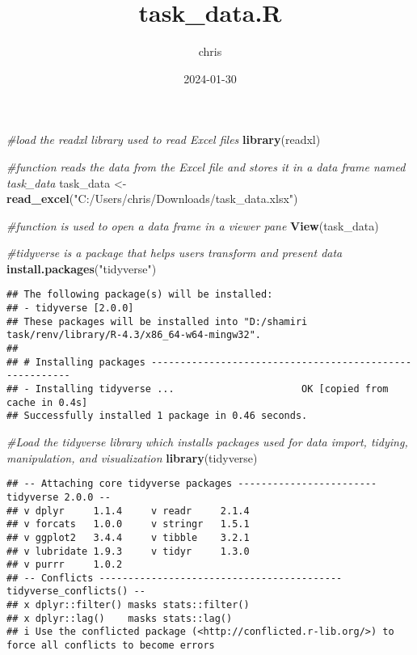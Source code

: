 \documentclass[
]{article}
\title{task\_data.R}
\author{chris}
\date{2024-01-30}
\newenvironment{Shaded}{\begin{snugshade}}{\end{snugshade}}
\newcommand{\CommentTok}[1]{\textcolor[rgb]{0.56,0.35,0.01}{\textit{#1}}}
\newcommand{\FunctionTok}[1]{\textcolor[rgb]{0.13,0.29,0.53}{\textbf{#1}}}
\newcommand{\NormalTok}[1]{#1}
\newcommand{\OtherTok}[1]{\textcolor[rgb]{0.56,0.35,0.01}{#1}}
\newcommand{\StringTok}[1]{\textcolor[rgb]{0.31,0.60,0.02}{#1}}
\begin{document}
\maketitle

\begin{Shaded}
\begin{Highlighting}[]
\CommentTok{\#load the readxl library used to read Excel files}
\FunctionTok{library}\NormalTok{(readxl)}

\CommentTok{\#function reads the data from the Excel file and stores it in a data frame named task\_data}
\NormalTok{task\_data }\OtherTok{\textless{}{-}} \FunctionTok{read\_excel}\NormalTok{(}\StringTok{"C:/Users/chris/Downloads/task\_data.xlsx"}\NormalTok{)}

\CommentTok{\#function is used to open a data frame in a viewer pane}
\FunctionTok{View}\NormalTok{(task\_data)}

\CommentTok{\#tidyverse is a package that helps users transform and present data}
\FunctionTok{install.packages}\NormalTok{(}\StringTok{"tidyverse"}\NormalTok{)}
\end{Highlighting}
\end{Shaded}

\begin{verbatim}
## The following package(s) will be installed:
## - tidyverse [2.0.0]
## These packages will be installed into "D:/shamiri task/renv/library/R-4.3/x86_64-w64-mingw32".
## 
## # Installing packages --------------------------------------------------------
## - Installing tidyverse ...                      OK [copied from cache in 0.4s]
## Successfully installed 1 package in 0.46 seconds.
\end{verbatim}

\begin{Shaded}
\begin{Highlighting}[]
\CommentTok{\#Load the tidyverse library which installs packages used for data import, tidying, manipulation, and visualization}
\FunctionTok{library}\NormalTok{(tidyverse)}
\end{Highlighting}
\end{Shaded}

\begin{verbatim}
## -- Attaching core tidyverse packages ------------------------ tidyverse 2.0.0 --
## v dplyr     1.1.4     v readr     2.1.4
## v forcats   1.0.0     v stringr   1.5.1
## v ggplot2   3.4.4     v tibble    3.2.1
## v lubridate 1.9.3     v tidyr     1.3.0
## v purrr     1.0.2     
## -- Conflicts ------------------------------------------ tidyverse_conflicts() --
## x dplyr::filter() masks stats::filter()
## x dplyr::lag()    masks stats::lag()
## i Use the conflicted package (<http://conflicted.r-lib.org/>) to force all conflicts to become errors
\end{verbatim}
\end{document}
